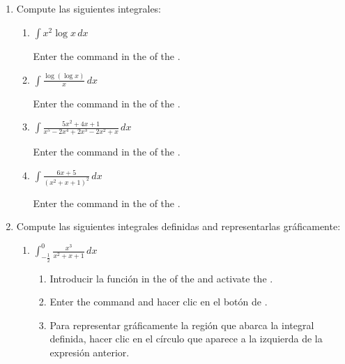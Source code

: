 \begin{enumerate}[leftmargin=*]
\item Compute las siguientes integrales:
      \begin{enumerate}
      \item $ \int{x^2 \log x\,dx}$
            \begin{indication}
            Enter the command  in the  of the  .
            \end{indication}

      \item $\displaystyle \int \frac{\log(\log x)}{x}\,dx$
            \begin{indication}
            Enter the command  in the  of the  .
            \end{indication}

      \item $\displaystyle \int \frac{5x^{2}+4x+1}{x^{5}-2x^{4}+2x^{3}-2x^{2}+x}\,dx$
            \begin{indication}
            Enter the command  in the  of the  .
            \end{indication}

      \item $\displaystyle \int \frac{6x+5}{(x^{2}+x+1)^{2}}\,dx$
            \begin{indication}
            Enter the command  in the  of the  .
            \end{indication}
      \end{enumerate}


\item Compute las siguientes integrales definidas and representarlas gráficamente:
      \begin{enumerate}
      \item $\displaystyle \int_{-\frac{1}{2}}^0 \frac{x^{3}}{x^{2}+x+1}\,dx$
            \begin{indication}
            \begin{enumerate}
            \item Introducir la función  in the  of the   and activate the .
            \item Enter the command  and hacer clic en el botón de .
            \item Para representar gráficamente la región que abarca la integral definida, hacer clic en el círculo que aparece a la izquierda de la expresión anterior.
            \end{enumerate}
            \end{indication}


\end{enumerate}
\end{enumerate}
